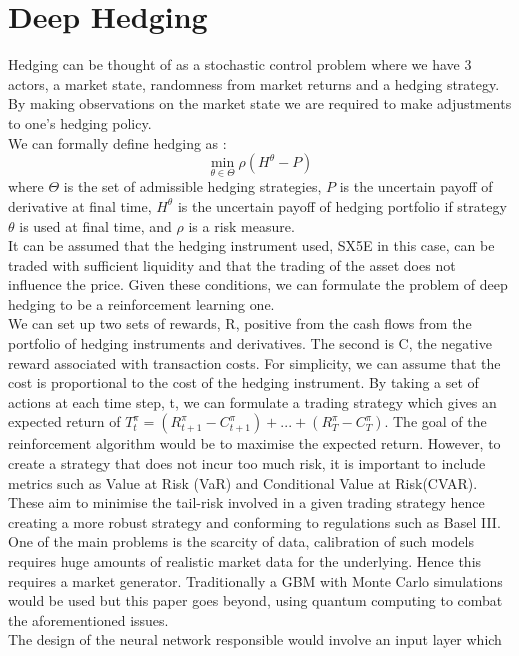 \documentclass[12pt]{article}
\numberwithin{equation}{section}
\begin{document}
\clearpage
\section{Deep Hedging}

Hedging can be thought of as a stochastic control problem where we have 3 actors, 
a market state, randomness from market returns and a hedging strategy. By making 
observations on the market state we are required to make adjustments to one's
hedging policy. 
\\
We can formally define hedging as :
$$\min_{\theta \in \Theta} \rho (H^\theta - P)$$
where $\Theta$ is the set of admissible hedging strategies, $P$ is the uncertain 
payoff of derivative at final time, $H^\theta$ is the uncertain payoff of hedging 
portfolio if strategy $\theta$ is used at final time, and $\rho$ is a risk measure.
\\
It can be assumed that the hedging instrument used, SX5E in this case, can be 
traded with sufficient liquidity and that the trading of the asset does not 
influence the price. Given these conditions, we can formulate the problem of deep 
hedging to be a reinforcement learning one. 
\\
We can set up two sets of rewards, R, positive from the cash flows from the 
portfolio of hedging instruments and derivatives. The second is C, the negative 
reward associated with transaction costs. For simplicity, we can assume that the 
cost is proportional to the cost of the hedging instrument. By taking a set of 
actions at each time step, t, we can formulate a trading strategy which gives an 
expected return of
$T^\pi_t = (R^\pi_{t+1} - C^\pi_{t+1} )+ ... +(R^\pi_T - C^\pi_T)$.
The goal of the reinforcement algorithm would be to maximise the expected return. 
However, to create a strategy that does not incur too much risk, it is important 
to include metrics such as Value at Risk (VaR) and Conditional Value at Risk(CVAR).
These aim to minimise the tail-risk involved in a given trading strategy hence 
creating a more robust strategy and conforming to regulations such as Basel III.
\cite{saissihassani_2021_the}
\\
One of the main problems is the scarcity of data, calibration of such models 
requires huge amounts of realistic market data for the underlying. Hence this
requires a market generator. Traditionally a GBM with Monte Carlo simulations 
would be used but this paper goes beyond, using quantum computing to combat the 
aforementioned issues. 
\\
The design of the neural network responsible would involve an input layer which
\end{document}
